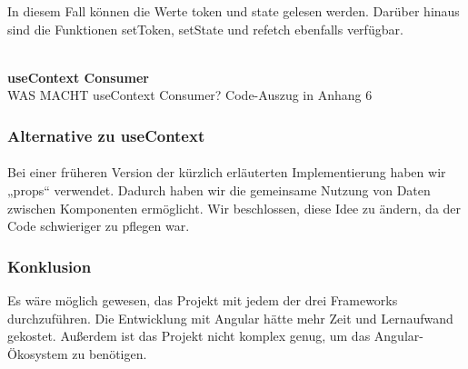 In diesem Fall können die Werte token und state gelesen werden. Darüber hinaus sind die Funktionen setToken, setState und refetch ebenfalls verfügbar.
\\\\
\newpage

\textbf{useContext Consumer} \\
WAS MACHT useContext Consumer?
Code-Auszug in Anhang 6



\subsubsection{Alternative zu useContext}
\paragraph{}
Bei einer früheren Version der kürzlich erläuterten Implementierung haben wir  „props“ verwendet. Dadurch haben wir die gemeinsame Nutzung von Daten zwischen Komponenten ermöglicht. Wir beschlossen, diese Idee zu ändern, da der Code schwieriger zu pflegen war.
\\

\subsubsection{Konklusion}
Es wäre möglich gewesen, das Projekt mit jedem der drei Frameworks durchzuführen.
Die Entwicklung mit Angular hätte mehr Zeit und Lernaufwand gekostet. Außerdem ist das Projekt nicht komplex genug, um das Angular-Ökosystem zu benötigen.
